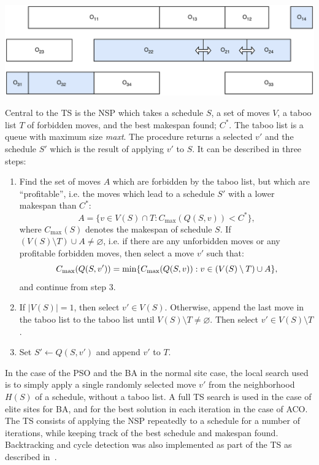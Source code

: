 \documentclass[paper=a4, fontsize=9pt]{scrartcl}
\begin{document}
\begin{multicols}{2}
{
\vspace{0.3cm}
\centering
\includegraphics[scale=0.1]{figures/permve-ntnu-it3708-project-4-2017-neighborhood}
\label{figure:neighborhood}
\vspace{0.3cm}
}

Central to the \ac{TS} is the \ac{NSP} which takes a schedule $S$, a set of moves $V$, a taboo list $T$ of forbidden moves, and the best makespan found; $C^*$. The taboo list is a queue with maximum size \textit{maxt}. The procedure returns a selected $v'$ and the schedule $S'$ which is the result of applying $v'$ to $S$. It can be described in three steps:

\begin{enumerate}
    \item Find the set of moves $A$ which are forbidden by the taboo list, but which are ``profitable'', i.e. the moves which lead to a schedule $S'$ with a lower makespan than $C^*$:
    \begin{equation}
        A = \{v \in V(S) \cap T : C_{\max}(Q(S, v)) < C^*\},
    \end{equation}
    where $C_{\max}(S)$ denotes the makespan of schedule $S$. If $(V(S) \setminus T) \cup A \ne \varnothing$, i.e. if there are any unforbidden moves or any profitable forbidden moves, then select a move $v'$ such that:
    \begin{equation}
        \small
        C_{\max}(Q(S, v')) = \min \{ C_{\max}(Q(S, v)) : v \in (V(S)\setminus T) \cup A \},
    \end{equation}
    and continue from step 3.
    \item If $|V(S)|=1$, then select $v' \in V(S)$. Otherwise, append the last move in the taboo list to the taboo list until ${ V(S)\setminus T \ne \varnothing }$. Then select ${v' \in V(S)\setminus T}$.
    \item Set $S' \gets Q(S, v')$ and append $v'$ to $T$.
\end{enumerate}

In the case of the \ac{PSO} and the \ac{BA} in the normal site case, the local search used is to simply apply a single randomly selected move $v'$ from the neighborhood $H(S)$ of a schedule, without a taboo list. A full \ac{TS} search is used in the case of elite sites for \ac{BA}, and for the best solution in each iteration in the case of \ac{ACO}. The \acl{TS} consists of applying the \acl{NSP} repeatedly to a schedule for a number of iterations, while keeping track of the best schedule and makespan found. Backtracking and cycle detection was also implemented as part of the \ac{TS} as described in~\cite{nowicki1996fast}.


\end{multicols}
\end{document}
